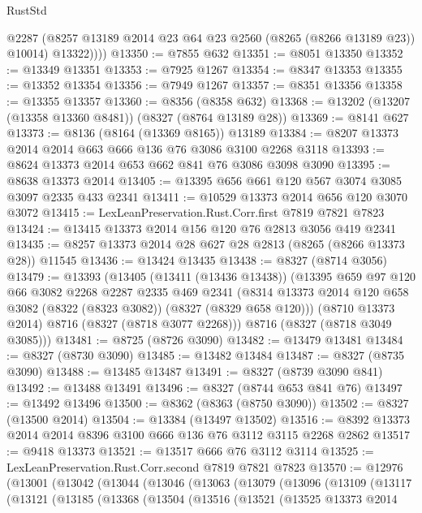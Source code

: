 \begin{lexlean}{RustStd}
\begin{coremodule}
{\begin{coremodule}
{{{{{{{{{{{{{{{{{{{{{{{{{{{{{{{{{{{{{{{{{{{{{{{{{{{{{{            @2287
            (@8257 @13189 @2014 @23 @64 @23 @2560 (@8265 (@8266 @13189 @23)) @10014)
            @13322))))
@13350 := @7855 @632
@13351 := @8051 @13350
@13352 := @13349 @13351
@13353 := @7925 @1267
@13354 := @8347 @13353
@13355 := @13352 @13354
@13356 := @7949 @1267
@13357 := @8351 @13356
@13358 := @13355 @13357
@13360 := @8356 (@8358 @632)
@13368 := @13202 (@13207 (@13358 @13360 @8481)) (@8327 (@8764 @13189 @28))
@13369 := @8141 @627
@13373 := @8136 (@8164 (@13369 @8165)) @13189
@13384 := @8207 @13373 @2014 @2014 @663 @666 @136 @76 @3086 @3100 @2268 @3118
@13393 := @8624 @13373 @2014 @653 @662 @841 @76 @3086 @3098 @3090
@13395 := @8638 @13373 @2014
@13405 := @13395 @656 @661 @120 @567 @3074 @3085 @3097 @2335 @433 @2341
@13411 := @10529 @13373 @2014 @656 @120 @3070 @3072
@13415 := LexLeanPreservation.Rust.Corr.first @7819 @7821 @7823
@13424 := @13415 @13373 @2014 @156 @120 @76 @2813 @3056 @419 @2341
@13435 := @8257 @13373 @2014 @28 @627 @28 @2813 (@8265 (@8266 @13373 @28)) @11545
@13436 := @13424 @13435
@13438 := @8327 (@8714 @3056)
@13479 := @13393
    (@13405
      (@13411 (@13436 @13438))
      (@13395
        @659
        @97
        @120
        @66
        @3082
        @2268
        @2287
        @2335
        @469
        @2341
        (@8314 @13373 @2014 @120 @658 @3082 (@8322 (@8323 @3082)) (@8327 (@8329 @658 @120)))
        (@8710 @13373 @2014)
        @8716
        (@8327 (@8718 @3077 @2268)))
      @8716
      (@8327 (@8718 @3049 @3085)))
@13481 := @8725 (@8726 @3090)
@13482 := @13479 @13481
@13484 := @8327 (@8730 @3090)
@13485 := @13482 @13484
@13487 := @8327 (@8735 @3090)
@13488 := @13485 @13487
@13491 := @8327 (@8739 @3090 @841)
@13492 := @13488 @13491
@13496 := @8327 (@8744 @653 @841 @76)
@13497 := @13492 @13496
@13500 := @8362 (@8363 (@8750 @3090))
@13502 := @8327 (@13500 @2014)
@13504 := @13384 (@13497 @13502)
@13516 := @8392 @13373 @2014 @2014 @8396 @3100 @666 @136 @76 @3112 @3115 @2268 @2862
@13517 := @9418 @13373
@13521 := @13517 @666 @76 @3112 @3114
@13525 := LexLeanPreservation.Rust.Corr.second @7819 @7821 @7823
@13570 := @12976
    (@13001
      (@13042
        (@13044
          (@13046
            (@13063
              (@13079
                (@13096
                  (@13109
                    (@13117
                      (@13121
                        (@13185
                          (@13368
                            (@13504
                              (@13516
                                (@13521
                                  (@13525
                                    @13373
                                    @2014
}}}}}}}}}}}}}}}}}}}}}}}}}}}}}}}}}}}}}}}}}}}}}}}}}}}}}}
\end{coremodule}}
\end{coremodule}
\end{lexlean}
